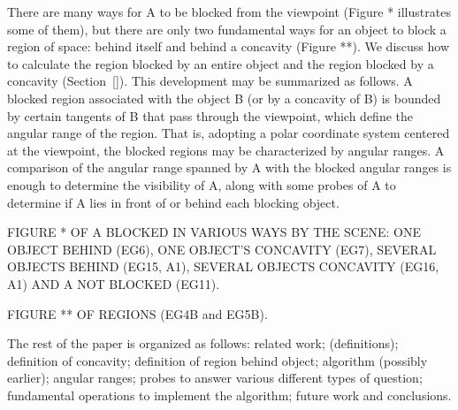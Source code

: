 \documentclass[12pt]{article}
\begin{document}
There are many ways for A to be blocked from the viewpoint (Figure * illustrates
some of them), 
but there are only two fundamental ways for an object to block a region of space:
behind itself and behind a concavity (Figure **).
We discuss how to calculate the region blocked by an entire object
and the region blocked by a concavity (Section~\ref{}).
This development may be summarized as follows.
A blocked region associated with the object B (or by a concavity of B)
is bounded by certain tangents of B that pass through the viewpoint,
which define the angular range of the region.
That is, adopting a polar coordinate system centered at the viewpoint,
the blocked regions may be characterized by angular ranges.
A comparison of the angular range spanned by A with the blocked angular ranges
is enough to determine the visibility of A,
along with some probes of A to determine if A lies in front of or behind 
each blocking object.

FIGURE * OF A BLOCKED IN VARIOUS WAYS BY THE SCENE: ONE OBJECT BEHIND (EG6), ONE OBJECT'S
CONCAVITY (EG7), SEVERAL OBJECTS BEHIND (EG15, A1), SEVERAL OBJECTS CONCAVITY (EG16, A1)
AND A NOT BLOCKED (EG11).

FIGURE ** OF REGIONS (EG4B and EG5B).


The rest of the paper is organized as follows:
related work;
(definitions); 
definition of concavity;
definition of region behind object;
algorithm (possibly earlier);
angular ranges;
probes to answer various different types of question;
fundamental operations to implement the algorithm;
future work and conclusions.









\end{document}

